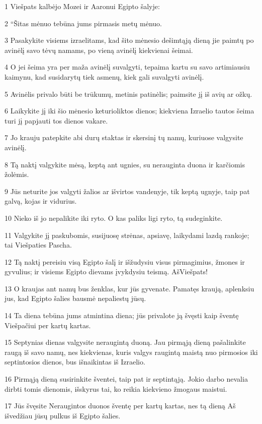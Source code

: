 \par 1 Viešpats kalbėjo Mozei ir Aaronui Egipto šalyje: 
\par 2 “Šitas mėnuo tebūna jums pirmasis metų mėnuo. 
\par 3 Pasakykite visiems izraelitams, kad šito mėnesio dešimtąją dieną jie paimtų po avinėlį savo tėvų namams, po vieną avinėlį kiekvienai šeimai. 
\par 4 O jei šeima yra per maža avinėlį suvalgyti, tepaima kartu su savo artimiausiu kaimynu, kad susidarytų tiek asmenų, kiek gali suvalgyti avinėlį. 
\par 5 Avinėlis privalo būti be trūkumų, metinis patinėlis; paimsite jį iš avių ar ožkų. 
\par 6 Laikykite jį iki šio mėnesio keturioliktos dienos; kiekviena Izraelio tautos šeima turi jį papjauti tos dienos vakare. 
\par 7 Jo krauju patepkite abi durų staktas ir skersinį tų namų, kuriuose valgysite avinėlį. 
\par 8 Tą naktį valgykite mėsą, keptą ant ugnies, su nerauginta duona ir karčiomis žolėmis. 
\par 9 Jūs neturite jos valgyti žalios ar išvirtos vandenyje, tik keptą ugnyje, taip pat galvą, kojas ir vidurius. 
\par 10 Nieko iš jo nepalikite iki ryto. O kas paliks ligi ryto, tą sudeginkite. 
\par 11 Valgykite jį paskubomis, susijuosę strėnas, apsiavę, laikydami lazdą rankoje; tai Viešpaties Pascha. 
\par 12 Tą naktį pereisiu visą Egipto šalį ir išžudysiu visus pirmagimius, žmones ir gyvulius; ir visiems Egipto dievams įvykdysiu teismą. Aš­Viešpats! 
\par 13 O kraujas ant namų bus ženklas, kur jūs gyvenate. Pamatęs kraują, aplenksiu jus, kad Egipto šalies bausmė nepaliestų jūsų. 
\par 14 Ta diena tebūna jums atmintina diena; jūs privalote ją švęsti kaip šventę Viešpačiui per kartų kartas. 
\par 15 Septynias dienas valgysite neraugintą duoną. Jau pirmąją dieną pašalinkite raugą iš savo namų, nes kiekvienas, kuris valgys raugintą maistą nuo pirmosios iki septintosios dienos, bus išnaikintas iš Izraelio. 
\par 16 Pirmąją dieną susirinkite šventei, taip pat ir septintąją. Jokio darbo nevalia dirbti tomis dienomis, išskyrus tai, ko reikia kiekvieno žmogaus maistui. 
\par 17 Jūs švęsite Neraugintos duonos šventę per kartų kartas, nes tą dieną Aš išvedžiau jūsų pulkus iš Egipto šalies. 
